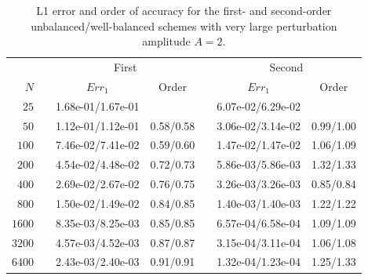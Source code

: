 \begin{table}\centering
\caption{L1 error and order of accuracy for the first- and second-order unbalanced/well-balanced schemes with very large perturbation amplitude $A=2$.}
\label{table:OVS_Alarge}
\begin{tabular}{@{}rcccccc@{}}\toprule
& \phantom{a} & \multicolumn{2}{c}{First} & \phantom{ab} & \multicolumn{2}{c}{Second}\\
\cmidrule{3-4} \cmidrule{6-7}
$N$ && $Err_1$ & Order && $Err_1$ & Order\\ \midrule
$25$ && 1.68e-01/1.67e-01 &&& 6.07e-02/6.29e-02 &\\
$50$ && 1.12e-01/1.12e-01 & 0.58/0.58 && 3.06e-02/3.14e-02 & 0.99/1.00\\
$100$ && 7.46e-02/7.41e-02 & 0.59/0.60 && 1.47e-02/1.47e-02 & 1.06/1.09\\
$200$ && 4.54e-02/4.48e-02 & 0.72/0.73 && 5.86e-03/5.86e-03 & 1.32/1.33\\
$400$ && 2.69e-02/2.67e-02 & 0.76/0.75 && 3.26e-03/3.26e-03 & 0.85/0.84\\
$800$ && 1.50e-02/1.49e-02 & 0.84/0.85 && 1.40e-03/1.40e-03 & 1.22/1.22\\
$1600$ && 8.35e-03/8.25e-03 & 0.85/0.85 && 6.57e-04/6.58e-04 & 1.09/1.09\\
$3200$ && 4.57e-03/4.52e-03 & 0.87/0.87 && 3.15e-04/3.11e-04 & 1.06/1.08\\
$6400$ && 2.43e-03/2.40e-03 & 0.91/0.91 && 1.32e-04/1.23e-04 & 1.25/1.33\\
\bottomrule
\end{tabular}
\end{table}

